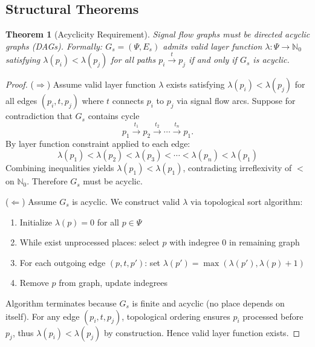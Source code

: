 \documentclass[10pt,letterpaper]{article}
\newtheorem{theorem}{Theorem}
\begin{document}
\subsection{Structural Theorems}

\begin{theorem}[Acyclicity Requirement]
Signal flow graphs must be directed acyclic graphs (DAGs). Formally: $G_s = (\Psi, E_s)$ admits valid layer function
$\lambda: \Psi \rightarrow \mathbb{N}_0$
satisfying $\lambda(p_i) < \lambda(p_j)$ for all paths $p_i \xrightarrow{t} p_j$ if and only if $G_s$ is acyclic.
\end{theorem}

\begin{proof}
($\Rightarrow$) Assume valid layer function $\lambda$ exists satisfying $\lambda(p_i) < \lambda(p_j)$ for all edges $(p_i,t,p_j)$ where $t$ connects $p_i$ to $p_j$ via signal flow arcs. Suppose for contradiction that $G_s$ contains cycle
\[
p_1 \xrightarrow{t_1} p_2 \xrightarrow{t_2} \cdots \xrightarrow{t_n} p_1.
\]
By layer function constraint applied to each edge:
\begin{equation*}
\lambda(p_1) < \lambda(p_2) < \lambda(p_3) < \cdots < \lambda(p_n) < \lambda(p_1)
\end{equation*}
Combining inequalities yields $\lambda(p_1) < \lambda(p_1)$, contradicting irreflexivity of $<$ on $\mathbb{N}_0$. Therefore $G_s$ must be acyclic.

($\Leftarrow$) Assume $G_s$ is acyclic. We construct valid $\lambda$ via topological sort algorithm:
\begin{enumerate}
\item Initialize $\lambda(p) = 0$ for all $p \in \Psi$
\item While exist unprocessed places: select $p$ with indegree 0 in remaining graph
\item For each outgoing edge $(p,t,p')$: set $\lambda(p') = \max(\lambda(p'), \lambda(p) + 1)$
\item Remove $p$ from graph, update indegrees
\end{enumerate}
Algorithm terminates because $G_s$ is finite and acyclic (no place depends on itself). For any edge $(p_i,t,p_j)$, topological ordering ensures $p_i$ processed before $p_j$, thus
$\lambda(p_i) < \lambda(p_j)$
by construction. Hence valid layer function exists.
\end{proof}
\end{document}
